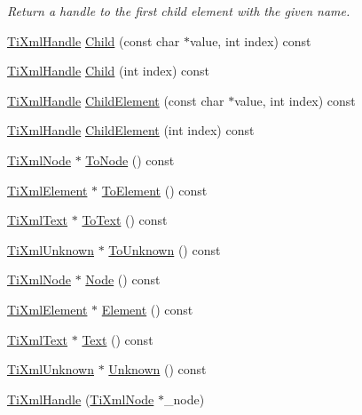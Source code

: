 \begin{DoxyCompactItemize}
\begin{DoxyCompactList}\small\item\em Return a handle to the first child element with the given name. \end{DoxyCompactList}\item 
\hyperlink{class_ti_xml_handle}{Ti\+Xml\+Handle} \hyperlink{class_ti_xml_handle_a072492b4be1acdb0db2d03cd8f71ccc4}{Child} (const char $\ast$value, int index) const 
\item 
\hyperlink{class_ti_xml_handle}{Ti\+Xml\+Handle} \hyperlink{class_ti_xml_handle_af9cf6a7d08a5da94a8924425ad0cd5ac}{Child} (int index) const 
\item 
\hyperlink{class_ti_xml_handle}{Ti\+Xml\+Handle} \hyperlink{class_ti_xml_handle_a979a3f850984a176ee884e394c7eed2d}{Child\+Element} (const char $\ast$value, int index) const 
\item 
\hyperlink{class_ti_xml_handle}{Ti\+Xml\+Handle} \hyperlink{class_ti_xml_handle_a8786475b9d1f1518492e3a46704c7ef0}{Child\+Element} (int index) const 
\item 
\hyperlink{class_ti_xml_node}{Ti\+Xml\+Node} $\ast$ \hyperlink{class_ti_xml_handle_af678e5088e83be67baf76f699756f2c3}{To\+Node} () const 
\item 
\hyperlink{class_ti_xml_element}{Ti\+Xml\+Element} $\ast$ \hyperlink{class_ti_xml_handle_abc6e7ed383a5fe1e52b0c0004b457b9e}{To\+Element} () const 
\item 
\hyperlink{class_ti_xml_text}{Ti\+Xml\+Text} $\ast$ \hyperlink{class_ti_xml_handle_a4ac53a652296203a5b5e13854d923586}{To\+Text} () const 
\item 
\hyperlink{class_ti_xml_unknown}{Ti\+Xml\+Unknown} $\ast$ \hyperlink{class_ti_xml_handle_a1381c17507a130767b1e23afc93b3674}{To\+Unknown} () const 
\item 
\hyperlink{class_ti_xml_node}{Ti\+Xml\+Node} $\ast$ \hyperlink{class_ti_xml_handle_ab44b723a8dc9af72838a303c079d0376}{Node} () const 
\item 
\hyperlink{class_ti_xml_element}{Ti\+Xml\+Element} $\ast$ \hyperlink{class_ti_xml_handle_acb5fe8388a526289ea65e817a51e05e7}{Element} () const 
\item 
\hyperlink{class_ti_xml_text}{Ti\+Xml\+Text} $\ast$ \hyperlink{class_ti_xml_handle_a9fc739c8a18d160006f82572fc143d13}{Text} () const 
\item 
\hyperlink{class_ti_xml_unknown}{Ti\+Xml\+Unknown} $\ast$ \hyperlink{class_ti_xml_handle_a49675b74357ba2aae124657a9a1ef465}{Unknown} () const 
\item 
\hypertarget{class_ti_xml_handle_aba18fd7bdefb942ecdea4bf4b8e29ec8}{\hyperlink{class_ti_xml_handle_aba18fd7bdefb942ecdea4bf4b8e29ec8}{Ti\+Xml\+Handle} (\hyperlink{class_ti_xml_node}{Ti\+Xml\+Node} $\ast$\+\_\+node)}\label{class_ti_xml_handle_aba18fd7bdefb942ecdea4bf4b8e29ec8}


\end{DoxyCompactItemize}
